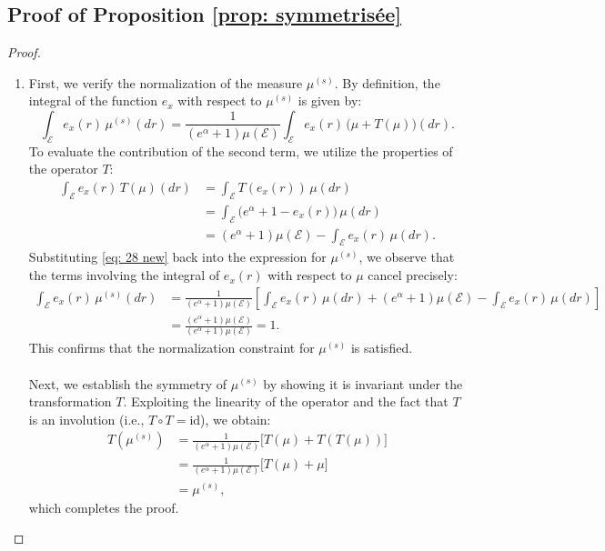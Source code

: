 \documentclass[a4paper, 11pt]{article}
\theoremstyle{definition}
\begin{document}
{\subsection{Proof of Proposition \ref{prop: symmetrisée}}
\begin{proof}
\begin{enumerate}
    \item {First, we verify the normalization of the measure $\mu^{(s)}$. By definition, the integral of the function $e_x$ with respect to $\mu^{(s)}$ is given by:
\begin{equation*}
\int_\mathcal{E} e_x(r) \, \mu^{(s)}(dr) = \frac{1}{(e^\alpha + 1)\mu(\mathcal{E})} \int_\mathcal{E} e_x(r) \, \big(\mu + T(\mu)\big)(dr).
\end{equation*}
To evaluate the contribution of the second term, we utilize the properties of the operator $T$:
\begin{align}\label{eq: 28 new}
\int_\mathcal{E} e_x(r) \, T(\mu)(dr) &= \int_\mathcal{E} T(e_x(r)) \, \mu(dr) \nonumber \\
&= \int_\mathcal{E} \big(e^\alpha + 1 - e_x(r)\big) \, \mu(dr) \\
&= (e^\alpha + 1)\mu(\mathcal{E}) - \int_\mathcal{E} e_x(r) \, \mu(dr). \nonumber
\end{align}
Substituting \eqref{eq: 28 new} back into the expression for $\mu^{(s)}$, we observe that the terms involving the integral of $e_x(r)$ with respect to $\mu$ cancel precisely:
\begin{align*}
\int_\mathcal{E} e_x(r) \, \mu^{(s)}(dr) &= \frac{1}{(e^\alpha + 1)\mu(\mathcal{E})} \left[ \int_\mathcal{E} e_x(r) \, \mu(dr) + (e^\alpha + 1)\mu(\mathcal{E}) - \int_\mathcal{E} e_x(r) \, \mu(dr) \right] \\
&= \frac{(e^\alpha + 1)\mu(\mathcal{E})}{(e^\alpha + 1)\mu(\mathcal{E})} = 1.
\end{align*}
This confirms that the normalization constraint for $\mu^{(s)}$ is satisfied.\\
\\
Next, we establish the symmetry of $\mu^{(s)}$ by showing it is invariant under the transformation $T$. Exploiting the linearity of the operator and the fact that $T$ is an involution (i.e., $T \circ T = \text{id}$), we obtain:
\begin{align*}
T(\mu^{(s)}) &= \frac{1}{(e^\alpha + 1)\mu(\mathcal{E})} \big[ T(\mu) + T(T(\mu)) \big] \\
&= \frac{1}{(e^\alpha + 1)\mu(\mathcal{E})} \big[ T(\mu) + \mu \big] \\
&= \mu^{(s)},
\end{align*}
which completes the proof.}
    


\end{enumerate}
\end{proof}}
\end{document}
